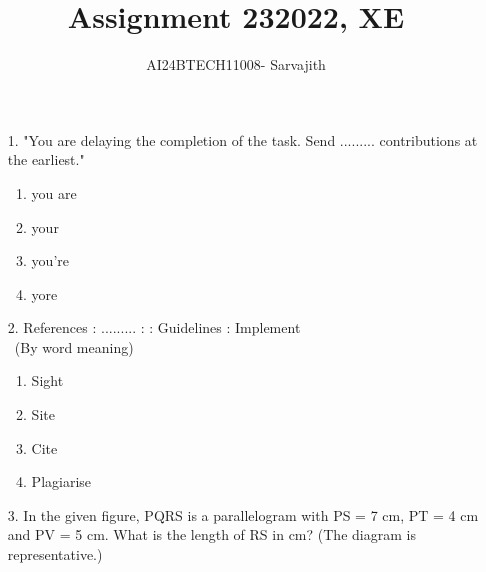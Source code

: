 \documentclass[journal]{IEEEtran}
\begin{document}

\vspace{3cm}


\author{AI24BTECH11008- Sarvajith
}
\title{Assignment 23}
{\let\newpage\relax\maketitle}
\title{2022, XE}
\renewcommand{\thefigure}{\theenumi}
\renewcommand{\thetable}{\theenumi}
\setlength{\intextsep}{10pt} %
\renewcommand{\thetable}{\theenumi}
\begin{enumerate}
    \item[1.] "You are delaying the completion of the task. Send ......... contributions at the
    earliest."
    \begin{enumerate}[label = (\Alph*)]
        \item you are
        \item your
        \item you're 
        \item yore
    \end{enumerate}
    \item[2.] References : ......... : : Guidelines : Implement\\\
    (By word meaning)
    \begin{enumerate}[label = (\Alph*)]
        \item Sight
        \item Site
        \item Cite 
        \item Plagiarise 
    \end{enumerate}
    \item[3.] In the given figure, PQRS is a parallelogram with PS = 7 cm, PT = 4 cm and
    PV = 5 cm. What is the length of RS in cm? (The diagram is representative.) 
    \begin{figure}[!ht]
        \centering
\end{figure}
\end{enumerate}
\end{document}
